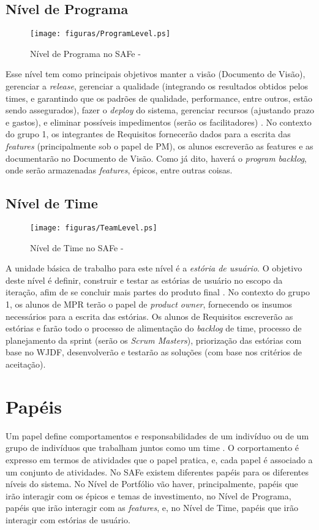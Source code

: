 \subsection{Nível de Programa}
\begin{figure}[h]
  \centering
  \caption{Nível de Programa no SAFe - \cite[p. 39]{safe001}}
  \texttt{[image: figuras/ProgramLevel.ps]}
\end{figure}
Esse nível tem como principais objetivos manter a visão (Documento de Visão), gerenciar a \emph{release}, gerenciar a qualidade (integrando os resultados obtidos pelos times, e garantindo que os padrões de qualidade, performance, entre outros, estão sendo assegurados), fazer o \emph{deploy} do sistema, gerenciar recursos (ajustando prazo e gastos), e eliminar possíveis impedimentos (serão os facilitadores) \cite[p. 63-64]{safe001}. No contexto do grupo 1, os integrantes de Requisitos fornecerão dados para a escrita das \emph{features} (principalmente sob o papel de PM), os alunos escreverão as features e as documentarão no Documento de Visão. Como já dito, haverá o \emph{program backlog}, onde serão armazenadas \emph{features}, épicos, entre outras coisas.

\subsection{Nível de Time}
\begin{figure}[h]
  \centering
  \caption{Nível de Time no SAFe - \cite[p. 34]{safe001}}
  \texttt{[image: figuras/TeamLevel.ps]}
\end{figure}
A unidade básica de trabalho para este nível é a \emph{estória de usuário}. O objetivo deste nível é definir, construir e testar as estórias de usuário no escopo da iteração, afim de se concluir mais partes do produto final \cite[p. 47-48]{safe001}. No contexto do grupo 1, os alunos de MPR terão o papel de \emph{product owner}, fornecendo os insumos necessários para a escrita das estórias. Os alunos de Requisitos escreverão as estórias e farão todo o processo de alimentação do \emph{backlog} de time, processo de planejamento da sprint (serão os \emph{Scrum Masters}), priorização das estórias com base no WJDF, desenvolverão e testarão as soluções (com base nos critérios de aceitação).

\section{Papéis}
Um papel define comportamentos e responsabilidades de um indivíduo ou de um grupo de indivíduos que trabalham juntos como um time \cite[p. 61-65]{kruchten001}. O corportamento é expresso em termos de atividades que o papel pratica, e, cada papel é associado a um conjunto de atividades. No SAFe existem diferentes papéis para os diferentes níveis do sistema. No Nível de Portfólio vão haver, principalmente, papéis que irão interagir com os épicos e temas de investimento, no Nível de Programa, papéis que irão interagir com as \emph{features}, e, no Nível de Time, papéis que irão interagir com estórias de usuário.

